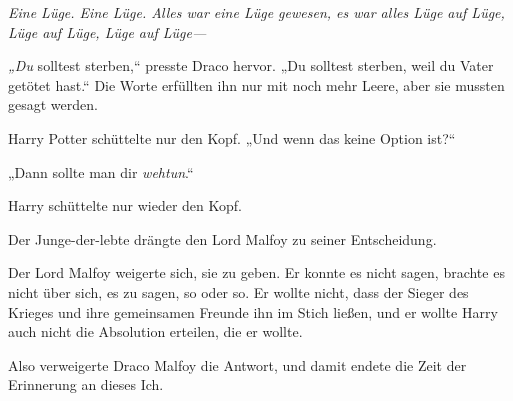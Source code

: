 \emph{Eine Lüge. Eine Lüge. Alles war eine Lüge gewesen, es war alles Lüge auf Lüge, Lüge auf Lüge, Lüge auf Lüge—}

\emph{„Du} solltest sterben,“ presste Draco hervor. „Du solltest sterben, weil du Vater getötet hast.“ Die Worte erfüllten ihn nur mit noch mehr Leere, aber sie mussten gesagt werden.

Harry Potter schüttelte nur den Kopf. „Und wenn das keine Option ist?“

„Dann sollte man dir \emph{wehtun}.“

Harry schüttelte nur wieder den Kopf.

Der Junge-der-lebte drängte den Lord Malfoy zu seiner Entscheidung.

Der Lord Malfoy weigerte sich, sie zu geben. Er konnte es nicht sagen, brachte es nicht über sich, es zu sagen, so oder so. Er wollte nicht, dass der Sieger des Krieges und ihre gemeinsamen Freunde ihn im Stich ließen, und er wollte Harry auch nicht die Absolution erteilen, die er wollte.

Also verweigerte Draco Malfoy die Antwort, und damit endete die Zeit der Erinnerung an dieses Ich.

\later

